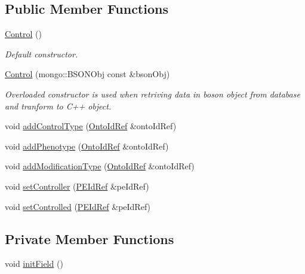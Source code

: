 \subsection*{Public Member Functions}
\begin{DoxyCompactItemize}
\item 
\hyperlink{classunisys_1_1Control_a45a42fd37436cba1202d12315f5258be}{Control} ()
\begin{DoxyCompactList}\small\item\em Default constructor. \end{DoxyCompactList}\item 
\hyperlink{classunisys_1_1Control_a762428d4e00ddf84baf7f1a020ab5b6d}{Control} (mongo\-::\-B\-S\-O\-N\-Obj const \&bson\-Obj)
\begin{DoxyCompactList}\small\item\em Overloaded constructor is used when retriving data in boson object from database and tranform to C++ object. \end{DoxyCompactList}\item 
void \hyperlink{classunisys_1_1Control_acfb48716bae9c0e0b8de04c31449db3b}{add\-Control\-Type} (\hyperlink{classunisys_1_1OntoIdRef}{Onto\-Id\-Ref} \&onto\-Id\-Ref)
\item 
void \hyperlink{classunisys_1_1Control_a5e008209a9c599b1aec5da00587f6297}{add\-Phenotype} (\hyperlink{classunisys_1_1OntoIdRef}{Onto\-Id\-Ref} \&onto\-Id\-Ref)
\item 
void \hyperlink{classunisys_1_1Control_aad4208e0899fa38f1160c16593c66f03}{add\-Modification\-Type} (\hyperlink{classunisys_1_1OntoIdRef}{Onto\-Id\-Ref} \&onto\-Id\-Ref)
\item 
void \hyperlink{classunisys_1_1Control_afcf95fc81aebf501b35f1cc11c7edc70}{set\-Controller} (\hyperlink{classunisys_1_1PEIdRef}{P\-E\-Id\-Ref} \&pe\-Id\-Ref)
\item 
void \hyperlink{classunisys_1_1Control_abdf99d44981306596d7120c46ea2a84f}{set\-Controlled} (\hyperlink{classunisys_1_1PEIdRef}{P\-E\-Id\-Ref} \&pe\-Id\-Ref)
\end{DoxyCompactItemize}
\subsection*{Private Member Functions}
\begin{DoxyCompactItemize}
\item 
void \hyperlink{classunisys_1_1Control_ab5bd5022b73b81e3fd18af06027213b1}{init\-Field} ()
\end{DoxyCompactItemize}
